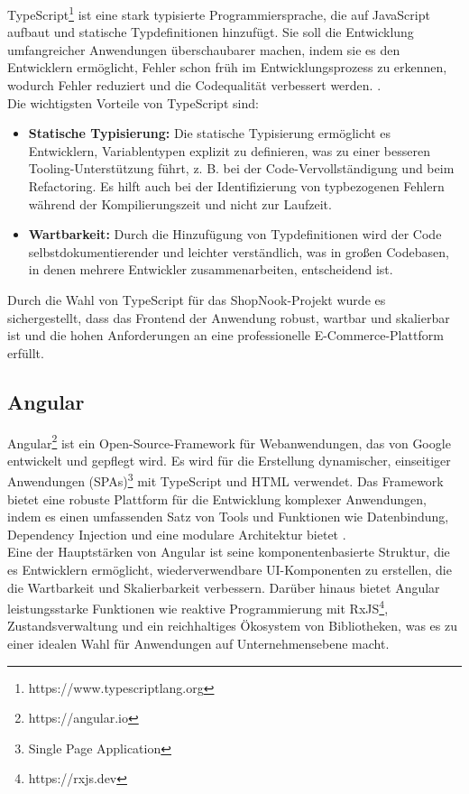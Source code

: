 TypeScript\footnote{https://www.typescriptlang.org} ist eine stark typisierte Programmiersprache, die auf JavaScript aufbaut und statische Typdefinitionen hinzufügt. Sie soll die Entwicklung umfangreicher Anwendungen überschaubarer machen, indem sie es den Entwicklern ermöglicht, Fehler schon früh im Entwicklungsprozess zu erkennen, wodurch Fehler reduziert und die Codequalität verbessert werden. \cite{Typescript:2024}.\\
Die wichtigsten Vorteile von TypeScript sind:
\begin{itemize}
	\item \textbf{Statische Typisierung:} Die statische Typisierung  ermöglicht es Entwicklern, Variablentypen explizit zu definieren, was zu einer besseren Tooling-Unterstützung führt, z. B. bei der Code-Vervollständigung und beim Refactoring. Es hilft auch bei der Identifizierung von typbezogenen Fehlern während der Kompilierungszeit und nicht zur Laufzeit.
	\item \textbf{Wartbarkeit:} Durch die Hinzufügung von Typdefinitionen wird der Code selbstdokumentierender und leichter verständlich, was in großen Codebasen, in denen mehrere Entwickler zusammenarbeiten, entscheidend ist.
\end{itemize}
Durch die Wahl von TypeScript für das ShopNook-Projekt wurde es sichergestellt, dass das Frontend der Anwendung robust, wartbar und skalierbar ist und die hohen Anforderungen an eine professionelle E-Commerce-Plattform erfüllt.

\subsection{Angular}

Angular\footnote{https://angular.io} ist ein Open-Source-Framework für Webanwendungen, das von Google entwickelt und gepflegt wird. Es wird für die Erstellung dynamischer, einseitiger Anwendungen (SPAs)\footnote{Single Page Application} mit TypeScript und HTML verwendet. Das Framework bietet eine robuste Plattform für die Entwicklung komplexer Anwendungen, indem es einen umfassenden Satz von Tools und Funktionen wie Datenbindung, Dependency Injection und eine modulare Architektur bietet \cite{Angular:2024}.\\
Eine der Hauptstärken von Angular ist seine komponentenbasierte Struktur, die es Entwicklern ermöglicht, wiederverwendbare UI-Komponenten zu erstellen, die die Wartbarkeit und Skalierbarkeit verbessern. Darüber hinaus bietet Angular leistungsstarke Funktionen wie reaktive Programmierung mit RxJS\footnote{https://rxjs.dev}, Zustandsverwaltung und ein reichhaltiges Ökosystem von Bibliotheken, was es zu einer idealen Wahl für Anwendungen auf Unternehmensebene macht.

